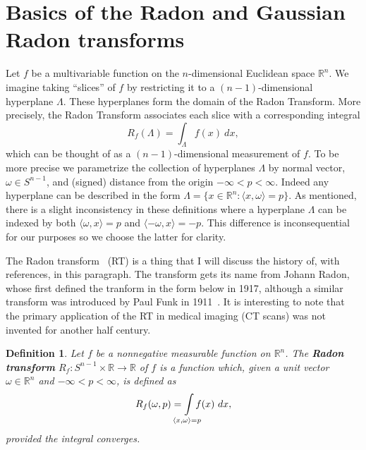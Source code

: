 \documentclass{amsart}
\newtheorem{definition}[theorem]{Definition}
\theoremstyle{remark}
\numberwithin{equation}{section}
\newcommand{\RR}{\mathbb{R}}
\def\mclimits_#1{\limits_{\mathclap{#1}}}
\begin{document}
 
    

\newpage
\section{Basics of the Radon and Gaussian Radon transforms}

Let $f$ be a multivariable function on the $n$-dimensional Euclidean space $\RR^n$. We imagine taking ``slices'' of $f$ by restricting it to a $(n-1)$-dimensional hyperplane $\Lambda$. These hyperplanes form the domain of the Radon Transform. More precisely, the Radon Transform associates each slice with a corresponding integral
\[
    R_f(\Lambda) = \int_{\Lambda} f(x) ~dx,
\]
which can be thought of as a $(n-1)$-dimensional measurement of $f$. To be more precise we parametrize the collection of hyperplanes $\Lambda$ by normal vector, $\omega \in S^{n-1}$, and (signed) distance from the origin $-\infty < p < \infty$. Indeed any hyperplane can be described in the form $\Lambda = \{x \in \RR^n: \langle x, \omega\rangle = p\}$. As mentioned, there is a slight inconsistency in these definitions where a hyperplane $\Lambda$ can be indexed by both $\langle \omega, x \rangle = p$ and $\langle -\omega, x \rangle = -p$. This difference is inconsequential for our purposes so we choose the latter for clarity.

The Radon transform~\cite{Helg65} (RT) is a thing that I will discuss the history of, with references, in this paragraph. The transform gets its name from Johann Radon, whose first defined the tranform in the form below in 1917, although a similar transform was introduced by Paul Funk in 1911~\cite{????}. It is interesting to note that the primary application of the RT in medical imaging (CT scans) was not invented for another half century.

\begin{definition}
    Let $f$ be a nonnegative measurable function on $\mathbb{R}^n$. The \textbf{Radon transform} $R_f : S^{n-1} \times \RR \rightarrow \RR$ of $f$ is a function which, given a unit vector $\omega \in \RR^n$ and $-\infty < p < \infty$, is defined as
    \[
        R_f(\omega, p) = \int\mclimits_{\langle x, \omega \rangle = p} f(x) ~dx,
    \]
    provided the integral converges.
\end{definition}
\end{document}
